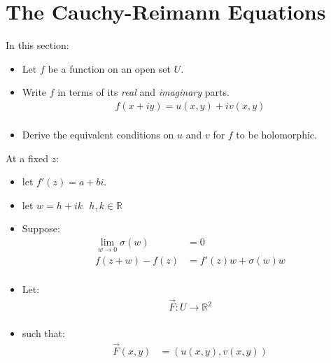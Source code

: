 \section{The Cauchy-Reimann Equations}
In this section:
\begin{itemize}
	\item Let $f$ be a function on an open set $U.$
	\item Write $f$ in terms of its \textit{real} and \textit{imaginary} parts.
	\begin{align*}
		f(x + iy) = u(x, y) + iv(x, y) \\
	\end{align*}
	\item Derive the equivalent conditions on $u$ and $v$ for $f$ to be holomorphic.
\end{itemize}

At a fixed $z$: 
\begin{itemize}
	\item let $f'(z) = a + bi.$
	\item let $w = h + ik \,\,\,\, h, k \in \mathbb{R}$
	\item Suppose:
	\begin{align*}
		\lim_{w \to 0} \sigma(w) &= 0 \\
		f(z + w) - f(z) &= f'(z)w + \sigma(w)w \\
	\end{align*}
	\item Let:
	\begin{align*}
		\vec{F}: U \to \mathbb{R}^2 \\
	\end{align*}
	\item such that:
	\begin{align*}
		\vec{F}(x, y) &= (u(x, y), v(x, y))
	\end{align*}
\end{itemize}

